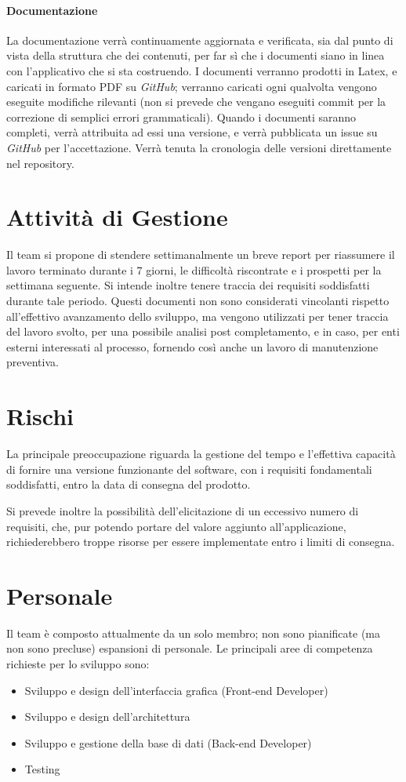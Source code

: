 \documentclass{article}
\begin{document}
 \paragraph{Documentazione}
     
La documentazione verrà continuamente aggiornata e verificata, sia dal punto di vista della struttura che dei contenuti, per far sì che i documenti siano in linea con l'applicativo che si sta costruendo. I documenti verranno prodotti in Latex, e caricati in formato PDF su \textit{GitHub}; verranno caricati ogni qualvolta vengono eseguite modifiche rilevanti (non si prevede che vengano eseguiti commit per la correzione di semplici errori grammaticali). Quando i documenti saranno completi, verrà attribuita ad essi una versione, e verrà pubblicata un issue su \textit{GitHub} per l'accettazione. Verrà tenuta la cronologia delle versioni direttamente nel repository.  
\section{Attività di Gestione}
\label{sec:5}
Il team si propone di stendere settimanalmente un breve report per riassumere il lavoro terminato durante i 7 giorni, le difficoltà riscontrate e i prospetti per la settimana seguente. Si intende inoltre tenere traccia dei requisiti soddisfatti durante tale periodo. Questi documenti non sono considerati vincolanti rispetto all'effettivo avanzamento dello sviluppo, ma vengono utilizzati per tener traccia del lavoro svolto, per una possibile analisi post completamento, e in caso, per enti esterni interessati al processo, fornendo così anche un lavoro di manutenzione preventiva.
\section{Rischi}
La principale preoccupazione riguarda la gestione del tempo e l'effettiva capacità di fornire una versione funzionante del software, con i requisiti fondamentali soddisfatti, entro la data di consegna del prodotto. \newline 

Si prevede inoltre la possibilità dell'elicitazione di un eccessivo numero di requisiti, che, pur potendo portare del valore aggiunto all'applicazione, richiederebbero troppe risorse per essere implementate entro i limiti di consegna.  
\section{Personale}
Il team è composto attualmente da un solo membro; non sono pianificate (ma non sono precluse) espansioni di personale. Le principali aree di competenza richieste per lo sviluppo sono:
\begin{itemize}
    \item Sviluppo e design dell'interfaccia grafica (Front-end Developer)
    \item Sviluppo e design dell'architettura  
    \item Sviluppo e gestione della base di dati (Back-end Developer) 
    \item Testing 
\end{itemize}
\end{document}
